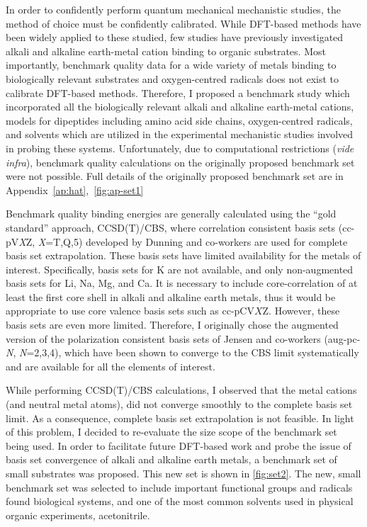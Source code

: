 In order to confidently perform quantum mechanical mechanistic studies, the method of choice must be confidently calibrated. While DFT-based methods have been widely applied to these studied, few studies have previously investigated alkali and alkaline earth-metal cation binding to organic substrates.\cite{Corral2003, Suarez2011, Siu2001, Baldauf2013} Most importantly, benchmark quality data for a wide variety of metals binding to biologically relevant substrates and oxygen-centred radicals does not exist to calibrate DFT-based methods. Therefore, I proposed a benchmark study which incorporated all the biologically relevant alkali and alkaline earth-metal cations, models for dipeptides including amino acid side chains, oxygen-centred radicals, and solvents which are utilized in the experimental mechanistic studies involved in probing these systems. Unfortunately, due to computational restrictions (\emph{vide infra}), benchmark quality calculations on the originally proposed benchmark set were not possible. Full details of the originally proposed benchmark set are in Appendix~\ref{ap:hat},~\ref{fig:ap-set1}

Benchmark quality binding energies are generally calculated using the ``gold standard'' approach, CCSD(T)/CBS, where correlation consistent basis sets\cite{Marshall2011, Rezac2013} (cc-pV\emph{X}Z, \emph{X}=T,Q,5) developed by Dunning an\cite{Vydrov2006, Vydrov2006a}d co-workers are used for complete basis set extrapolation. These basis sets have limited availability for the metals of interest. Specifically, basis sets for K are not available, and only non-augmented basis sets for Li, Na, Mg, and Ca. It is necessary to include core-correlation of at least the first core shell in alkali and alkaline earth metals, thus it would be appropriate to use core valence basis sets such as cc-pCV$X$Z.\cite{Peterson2002} However, these basis sets are even more limited. Therefore, I originally chose the augmented version of the polarization consistent basis sets of Jensen and co-workers\cite{Jensen2001, Jensen2002, Jensen2002a, Jensen2003}  (aug-pc-\emph{N}, \emph{N}=2,3,4), which have been shown to converge to the CBS limit systematically\cite{Kupka2007} and are available for all the elements of interest.

While performing CCSD(T)/CBS calculations, I observed that the metal cations (and neutral metal atoms), did not converge smoothly to the complete basis set limit. As a consequence, complete basis set extrapolation is not feasible. In light of this problem, I decided to re-evaluate the size scope of the benchmark set being used. In order to facilitate future DFT-based work and probe the issue of basis set convergence of alkali and alkaline earth metals, a benchmark set of small substrates was proposed. This new set is shown in \ref{fig:set2}. The new, small benchmark set was selected to include important functional groups and radicals found biological systems, and one of the most common solvents used in physical organic experiments, acetonitrile.

